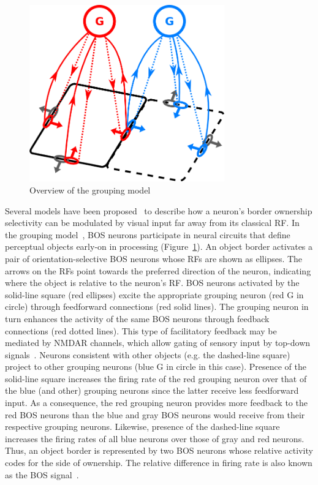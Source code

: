 \begin{figure}[t]
\centering
\includegraphics[width=0.75\textwidth]{Intro/figs/groupingcircuit}
\makeatletter
\let\@currsize\normalsize
\caption{Overview of the grouping model}
\label{fig:GroupingModel}
\end{figure}

Several models have been proposed~\citep{Zhaoping05, Sakai_Nishimura06,Craft_etal07, Layton_etal12} to describe how a neuron's border ownership selectivity can be modulated by visual input far away from its classical RF. In the grouping model~\citep{Craft_etal07}, BOS neurons participate in neural circuits that define perceptual objects early-on in processing (Figure~\ref{fig:GroupingModel}). An object border activates a pair of orientation-selective BOS neurons whose RFs are shown as ellipses. The arrows on the RFs point towards the preferred direction of the neuron, indicating where the object is relative to the neuron's RF. BOS neurons activated by the solid-line square (red ellipses) excite the appropriate grouping neuron (red G in circle) through feedforward connections (red solid lines). The grouping neuron in turn enhances the activity of the same BOS neurons through feedback connections (red dotted lines). This type of facilitatory feedback may be mediated by NMDAR channels, which allow gating of sensory input by top-down signals~\citep{Palmer_etal14}. Neurons consistent with other objects (e.g. the dashed-line square) project to other grouping neurons (blue G in circle in this case). Presence of the solid-line square increases the firing rate of the red grouping neuron over that of the blue (and other) grouping neurons since the latter receive less feedforward input. As a consequence, the red grouping neuron provides more feedback to the red BOS neurons than the blue and gray BOS neurons would receive from their respective grouping neurons. Likewise, presence of the dashed-line square increases the firing rates of all blue neurons over those of gray and red neurons. Thus, an object border is represented by two BOS neurons whose relative activity codes for the side of ownership. The relative difference in firing rate is also known as the BOS signal~\citep{Zhou_etal00}.

